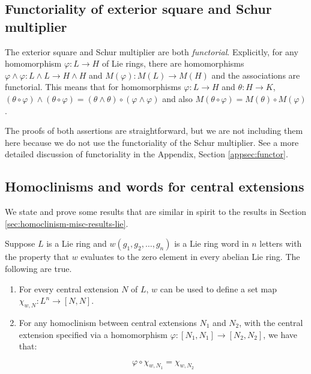 \subsection{Functoriality of exterior square and Schur multiplier}\label{sec:functoriality-lie}

The exterior square and Schur multiplier are both {\em
  functorial}. Explicitly, for any homomorphism $\varphi:L \to H$ of
Lie rings, there are homomorphisms $\varphi \wedge \varphi: L \wedge L
\to H \wedge H$ and $M(\varphi): M(L) \to M(H)$ and the associations
are functorial. This means that for homomorphisms $\varphi:L \to H$
and $\theta: H \to K$, $(\theta \circ \varphi) \wedge (\theta \circ
\varphi) = (\theta \wedge \theta) \circ (\varphi \wedge \varphi)$ and
also $M(\theta \circ \varphi) = M(\theta) \circ M(\varphi)$.

The proofs of both assertions are straightforward, but we are not
including them here because we do not use the functoriality of the
Schur multiplier. See a more detailed discussion of functoriality in
the Appendix, Section \ref{appsec:functor}.

\subsection{Homoclinisms and words for central extensions}\label{sec:homoclinisms-words-central-extensions-lie}

We state and prove some results that are similar in spirit to the
results in Section \ref{sec:homoclinism-misc-results-lie}.

\begin{lemma}\label{lemma:iterated-bracket-descends-extension-version}
  Suppose $L$ is a Lie ring and $w(g_1,g_2,\dots,g_n)$ is a Lie ring
  word in $n$ letters with the property that $w$ evaluates to the zero
  element in every abelian Lie ring. The following are true.

  \begin{enumerate}
  \item For every central extension $N$ of $L$, $w$ can be used to
    define a set map $\chi_{w,N}: L^n \to [N,N]$.
  \item For any homoclinism between central extensions $N_1$ and
    $N_2$, with the central extension specified via a homomorphism
    $\varphi:[N_1,N_1] \to [N_2,N_2]$, we have that:

    $$\varphi \circ \chi_{w,N_1} = \chi_{w,N_2}$$
  \end{enumerate}
\end{lemma}

